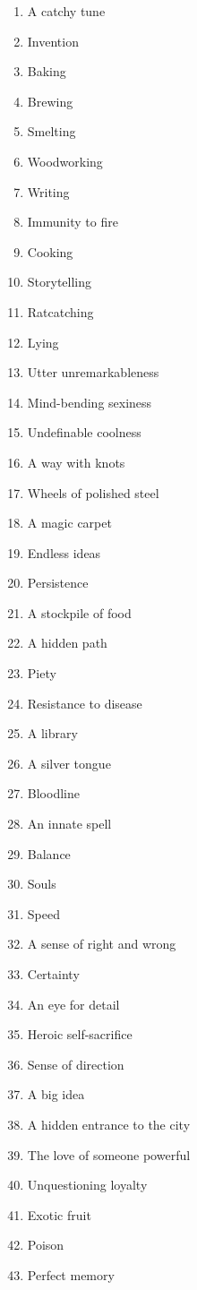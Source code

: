 \begin{enumerate}
\item A catchy tune
\item Invention
\item Baking
\item Brewing
\item Smelting
\item Woodworking
\item Writing
\item Immunity to fire
\item Cooking
\item Storytelling
\item Ratcatching
\item Lying
\item Utter unremarkableness
\item Mind-bending sexiness
\item Undefinable coolness
\item A way with knots
\item Wheels of polished steel
\item A magic carpet
\item Endless ideas
\item Persistence
\item A stockpile of food
\item A hidden path
\item Piety
\item Resistance to disease
\item A library
\item A silver tongue
\item Bloodline
\item An innate spell
\item Balance
\item Souls
\item Speed
\item A sense of right and wrong
\item Certainty
\item An eye for detail
\item Heroic self-sacrifice
\item Sense of direction
\item A big idea
\item A hidden entrance to the city
\item The love of someone powerful
\item Unquestioning loyalty
\item Exotic fruit
\item Poison
\item Perfect memory

\end{enumerate}
